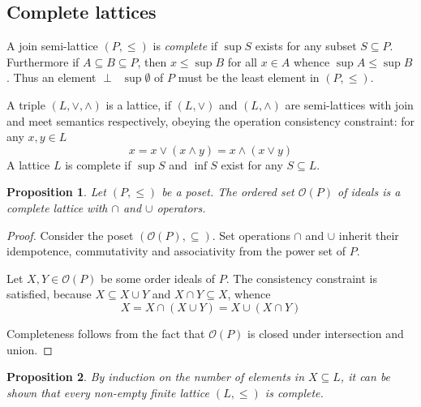 \documentclass[a4paper]{article}
\newcommand{\brac}[1]{{\left ( #1 \right )}}
\newcommand{\Ocal}{\mathcal{O}}
\newtheorem{prop}{Proposition}
\newcommand{\defn}{\mathop{\overset{\Delta}{=}}\nolimits}
\begin{document}

\subsection{Complete lattices} %
\label{sub:complete_lattices}

A join semi-lattice $(P,\leq)$ is \emph{complete} if $\sup S$ exists for any subset $S\subseteq P$. Furthermore if $A\subseteq B\subseteq P$, then $x\leq \sup B$ for all $x\in A$ whence $\sup A\leq\sup B$. Thus an element $\perp \defn \sup \emptyset$ of $P$ must be the least element in $(P,\leq)$.

A triple $(L,\vee,\wedge)$ is a lattice, if $(L,\vee)$ and $(L,\wedge)$ are semi-lattices with join and meet semantics respectively, obeying the operation consistency constraint: for any $x,y\in L$ \[x = x\vee(x\wedge y) = x \wedge (x\vee y)\] A lattice $L$ is complete if $\sup S$ and $\inf S$ exist for any $S\subseteq L$.

\begin{prop} Let $(P,\leq)$ be a poset. The ordered set $\Ocal(P)$ of ideals is a complete lattice with $\cap$ and $\cup$ operators.
\end{prop}

\begin{proof} Consider the poset $\brac{\Ocal(P), \subseteq}$. Set operations $\cap$ and $\cup$ inherit their idempotence, commutativity and associativity from the power set of $P$.

Let $X,Y\in \Ocal(P)$ be some order ideals of $P$. The consistency constraint is satisfied, because $X\subseteq X\cup Y$ and $X\cap Y\subseteq X$, whence \[X = X\cap(X\cup Y) = X\cup(X\cap Y)\]

Completeness follows from the fact that $\Ocal(P)$ is closed under intersection and union.
\end{proof}

\begin{prop} By induction on the number of elements in $X\subseteq L$, it can be shown that every non-empty finite lattice $(L,\leq)$ is complete.
\end{prop}
\end{document}

